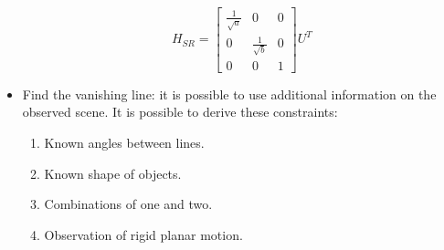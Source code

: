 \documentclass[12pt, a4paper]{report}
\newtheorem[style=M,bodystyle=\normalfont]{theorem}{Theorem}
\newtheorem[style=M,bodystyle=\normalfont]{corollary}{Corollary}
\newtheorem[style=M,bodystyle=\normalfont]{lemma}{Lemma}
\newtheorem[style=M,bodystyle=\normalfont]{definition}{Definition}
\begin{document}
\begin{itemize}
            \[H_{SR}=
            \begin{bmatrix}
                \frac{1}{\sqrt{a}} & 0 & 0 \\
                0 & \frac{1}{\sqrt{b}} & 0 \\
                0 & 0 & 1
            \end{bmatrix}
            U^T
            \]
        \item Find the vanishing line: it is possible to use additional information on the observed scene. It is possible to derive these constraints: 
            \begin{enumerate}
                \item Known angles between lines. 
                \item Known shape of objects.
                \item Combinations of one and two.
                \item Observation of rigid planar motion.
            \end{enumerate}

    \end{itemize}
\end{document}
